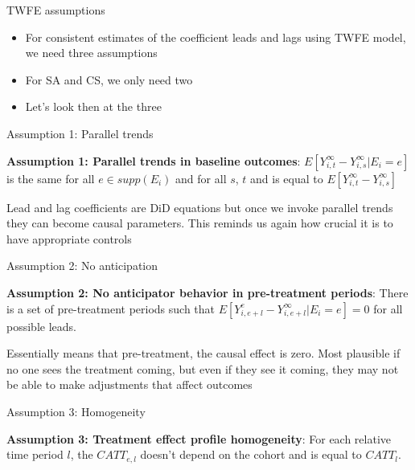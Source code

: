 \documentclass{beamer}
\begin{document}
\begin{frame}{TWFE assumptions}

\begin{itemize}
\item For consistent estimates of the coefficient leads and lags using TWFE model, we need three assumptions
\item For SA and CS, we only need two
\item Let's look then at the three
\end{itemize}

\end{frame}


\begin{frame}{Assumption 1: Parallel trends}

\textbf{Assumption 1: Parallel trends in baseline outcomes}: $E[Y^{\infty}_{i,t} - Y^{\infty}_{i,s} | E_i = e ]$ is the same for all $e \in supp(E_i)$ and for all $s$, $t$ and is equal to $E[Y^{\infty}_{i,t} - Y^{\infty}_{i,s} ]$

\bigskip

Lead and lag coefficients are DiD equations but once we invoke parallel trends they can become causal parameters.  This reminds us again how crucial it is to have  appropriate controls

\end{frame}


\begin{frame}{Assumption 2: No anticipation}

\textbf{Assumption 2: No anticipator behavior in pre-treatment periods}: There is a set of pre-treatment periods such that $E[Y_{i,e+l}^e - Y_{i,e+l}^{\infty} | E_i = e]=0$ for all possible leads.

\bigskip

Essentially means that pre-treatment, the causal effect is zero.  Most plausible if no one sees the treatment coming, but even if they see it coming, they may not be able to make adjustments that affect outcomes

\end{frame}


\begin{frame}{Assumption 3: Homogeneity}

\textbf{Assumption 3: Treatment effect profile homogeneity}: For each relative time period $l$, the $CATT_{e,l}$ doesn't depend on the cohort and is equal to $CATT_l$. 


\end{frame}
\end{document}
